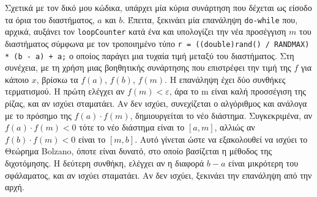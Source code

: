 \documentclass[a4paper, 14pt]{article}   %
\begin{document}
Σχετικά με τον δικό μου κώδικα, υπάρχει μία κύρια συνάρτηση που δέχεται ως είσοδο τα όρια του διαστήματος, \(a\) και \(b\). Έπειτα, ξεκινάει μία επανάληψη \texttt{do-while} που, αρχικά, αυξάνει τον \texttt{loopCounter} κατά ένα και υπολογίζει την νέα προσέγγιση \(m\) του διαστήματος σύμφωνα με τον τροποιημένο τύπο \texttt{r = ((double)rand() / RANDMAX) * (b - a) + a;} ο οποίος παράγει μια τυχαία τιμή μεταξύ του διαστήματος. Στη συνέχεια, με τη χρήση μιας βοηθητικής συνάρτησης που επιστρέφει την τιμή της \(f\) για κάποιο \(x\), βρίσκω τα \(f(a)\), \(f(b)\), \(f(m)\). Η επανάληψη έχει δύο συνθήκες τερματισμού. Η πρώτη ελέγχει αν \(f(m) < ε\), άρα το m είναι καλή προσσέγιση της ρίζας, και αν ισχύει σταματάει. Αν δεν ισχύει, συνεχίζεται ο αλγόριθμος και ανάλογα με το πρόσημο της \(f(a) \cdot f(m)\), δημιουργείται το νέο διάστημα. Συγκεκριμένα, αν \(f(a) \cdot f(m) < 0\) τότε το νέο διάστημα είναι το \([a,m]\), αλλιώς αν \(f(b) \cdot f(m) < 0\) είναι το \([m,b]\). Αυτό γίνεται ώστε να εξακολουθεί να ισχύει το Θεώρημα Bolzano, όποτε είναι δυνατό, στο οποίο βασίζεται η μέθοδος της διχοτόμησης. Η δεύτερη συνθήκη, ελέγχει αν η διαφορά \(b-a\) είναι μικρότερη του σφάλαματος, και αν ισχύει σταματάει. Αν δεν ισχύει, ξεκινάει την επανάληψη από την αρχή.\\
\end{document}
